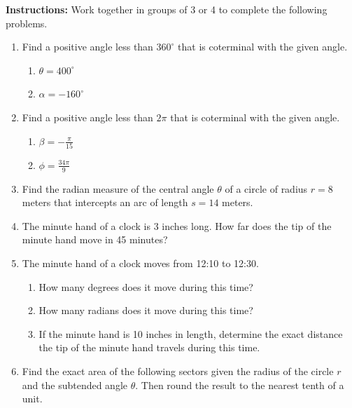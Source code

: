 



\noindent \textbf{Instructions:}  Work together in groups of  3 or 4 to complete the following problems.\\


\begin{enumerate}


\item Find a positive angle less than $360^\circ$ that is coterminal with the given angle.
\begin{enumerate}
\item  $\theta=400^\circ$\vfill
\item $\alpha=-160^\circ$\vfill
\vfill
\end{enumerate}


\item Find a positive angle less than $2\pi$ that is coterminal with the given angle.
\begin{enumerate}
\item  $\displaystyle \beta=-\frac{\pi}{15}$\vfill
\item $\displaystyle \phi=\frac{34\pi}{9}$\vfill
\vfill
\end{enumerate}

\item Find the radian measure of the central angle $\theta$ of a circle of radius $r=8$ meters that intercepts an arc of length $s=14$ meters.\vfill
\vfill
\newpage

\item The minute hand of a clock is 3 inches long.  How far does the tip of the minute hand move in 45 minutes?\vfill

\item The minute hand of a clock moves from 12:10 to 12:30.
\begin{enumerate}
\item How many degrees does it move during this time?\vfill
\item How many radians does it move during this time?\vfill
\item If the minute hand is 10 inches in length, determine the exact distance the tip of the minute hand travels during this time.\vfill
\end{enumerate}
\newpage

\item Find the exact area of the following sectors given the radius of the circle $r$ and the subtended angle $\theta$.  Then round the result to the nearest tenth of a unit.


\end{enumerate}
